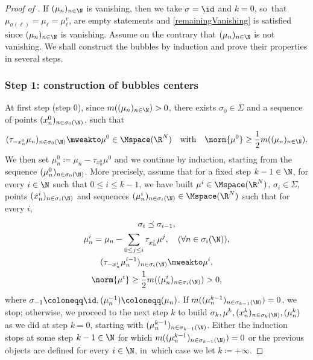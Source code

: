 \begin{proof}[Proof of ]
If \((\mu_n)_{n\in\N}\) is vanishing, then we take $\sigma = \id$ and $k=0$, so~that $\mu_{\sigma(\ell)} = \mu_\ell = \mu^v_\ell$,  are empty statements and \ref{remainingVanishing} is satisfied since $(\mu_n)_{n\in\N}$ is vanishing. Assume on the contrary that \((\mu_n)_{n\in\N}\) is not vanishing. We shall construct the bubbles by induction and prove their properties in several steps.

\subsubsection*{Step 1: construction of bubbles centers} At first step (step $0$), since \(m((\mu_n)_{n\in\N})>0\), there exists $\sigma_0 \in \Sigma$ and a sequence of points \((x^0_{n})_{n \in \sigma_0(\N)}\), such that
\begin{equation}
(\tau_{-x^0_{n}} \mu_n)_{n \in \sigma_0(\N)}\mweakto\mu^0\in\Mspace(\R^N)\quad\text{with}\quad\norm{\mu^0} \geq \frac 12 m((\mu_n)_{n\in\N}).
\end{equation}
We then set \(\mu^0_n\coloneqq\mu_n-\tau_{x^0_n}\mu^0\) and we continue by induction, starting from the sequence \((\mu^0_n)_{n\in\sigma_0(\N)}\). More precisely, assume that for a fixed step $k-1 \in \N$, for every \(i\in\N\) such that \(0\le i\le k-1\), we have built $\mu^i \in \Mspace(\R^N)$, $\sigma_i \in \Sigma$, points $(x^i_n)_{n\in \sigma_i(\N)}$ and sequences $(\mu^i_{n})_{n\in \sigma_i(\N)} \in \Mspace(\R^N)$ such that for every $i$,
\begin{gather}
\sigma_i \preceq \sigma_{i-1},\label{bubbleInduction1}\\
\mu^i_{n} = \mu_n -\sum_{0\leq j \leq i} \tau_{x^j_n}\mu^j, \quad (\forall n \in \sigma_i(\N)),\label{bubbleInduction2}\\
(\tau_{-x^i_n} \mu^{i-1}_n)_{n\in\sigma_i(\N)} \mweakto \mu^i,\label{bubbleInduction3}\\
\norm{\mu^i} \geq \frac 12 m((\mu^i_n)_{n \in\sigma_i(\N)})>0,\label{bubbleInduction4}
\end{gather}
where $\sigma_{-1} \coloneqq \id, (\mu_n^{-1}) \coloneqq (\mu_n)$. If $m((\mu^{k-1}_n)_{n\in \sigma_{k-1}(\N)}) = 0$, we stop; otherwise, we proceed to the next step $k$ to build $\sigma_k, \mu^k, (x_n^k)_{n\in\sigma_k(\N)}, (\mu_n^k)$ as we did at step $k=0$, starting with $(\mu^{k-1}_n)_{n\in\sigma_{k-1}(\N)}$. Either the induction stops at some step \(k-1\in\N\) for which \(m((\mu^{k-1}_{n})_{n\in \sigma_{k-1}(\N)})=0\) or the previous objects are defined for every \(i\in\N\), in~which case we let \(k \coloneqq +\infty\).


\end{proof}
